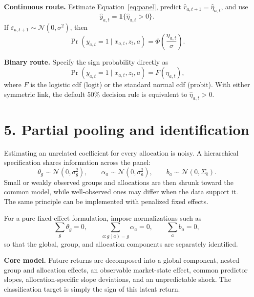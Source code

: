\documentclass[10pt,a4paper]{article}
\begin{document}
\textbf{Continuous route.} Estimate Equation~\eqref{eq:panel}, predict
$\widehat r_{a,t+1}=\widehat\eta_{a,t}$, and use
\[
  \widehat y_{a,t}=\mathbf 1\{\widehat\eta_{a,t}>0\}.
\]
If $\varepsilon_{a,t+1}\sim\mathcal N(0,\sigma^2)$, then
\[
  \Pr(y_{a,t}=1\mid x_{a,t},z_t,a)
  =\Phi\!\left(\frac{\eta_{a,t}}{\sigma}\right).
\]

\textbf{Binary route.} Specify the sign probability directly as
\begin{equation}
  \Pr(y_{a,t}=1\mid x_{a,t},z_t,a)
  =F(\eta_{a,t}),
\label{eq:binary}
\end{equation}
where $F$ is the logistic cdf (logit) or the standard normal cdf (probit).
With either symmetric link, the default $50\%$ decision rule is equivalent to
$\widehat\eta_{a,t}>0$.

\section*{5. Partial pooling and identification}

Estimating an unrelated coefficient for every allocation is noisy. A
hierarchical specification shares information across the panel:
\[
  \theta_g\sim\mathcal N(0,\sigma_g^2),\qquad
  \alpha_a\sim\mathcal N(0,\sigma_a^2),\qquad
  b_a\sim\mathcal N(0,\Sigma_b).
\]
Small or weakly observed groups and allocations are then shrunk toward the
common model, while well-observed ones may differ when the data support it.
The same principle can be implemented with penalized fixed effects.

For a pure fixed-effect formulation, impose normalizations such as
\[
  \sum_g\theta_g=0,
  \qquad
  \sum_{a:g(a)=g}\alpha_a=0,
  \qquad
  \sum_a b_a=0,
\]
so that the global, group, and allocation components are separately identified.

\vfill
\begin{center}
\colorbox{qrtlight}{\parbox{0.91\linewidth}{\small
\textbf{Core model.} Future returns are decomposed into a global component,
nested group and allocation effects, an observable market-state effect, common
predictor slopes, allocation-specific slope deviations, and an unpredictable
shock. The classification target is simply the sign of this latent return.}}
\end{center}
\end{document}
